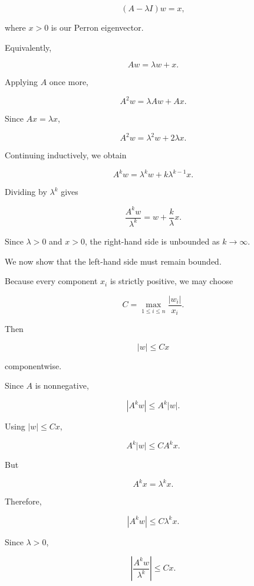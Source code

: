 \documentclass[11pt,a4paper]{article}
\theoremstyle{definition}
\theoremstyle{remark}
\begin{document}
\begin{equation}
(A-\lambda I)w=x,
\label{eq:perron_generalized_vector}
\end{equation}

where $x>0$ is our
Perron eigenvector.

Equivalently,

\[
Aw=\lambda w+x.
\]

Applying $A$ once more,

\[
A^2w
=
\lambda Aw+Ax.
\]

Since $Ax=\lambda x$,

\[
A^2w
=
\lambda^2w+2\lambda x.
\]

Continuing inductively,
we obtain

\begin{equation}
A^kw
=
\lambda^kw+k\lambda^{k-1}x.
\label{eq:perron_jordan_growth}
\end{equation}

Dividing by $\lambda^k$ gives

\begin{equation}
\frac{A^kw}{\lambda^k}
=
w+\frac{k}{\lambda}x.
\label{eq:perron_unbounded_growth}
\end{equation}

Since $\lambda>0$ and
$x>0$, the right-hand side
is unbounded as
$k\to\infty$.

We now show that the
left-hand side must
remain bounded.

Because every component
$x_i$ is strictly positive,
we may choose

\[
C=
\max_{1\leq i\leq n}
\frac{|w_i|}{x_i}.
\]

Then

\[
|w|\leq Cx
\]

componentwise.

Since $A$ is nonnegative,

\[
|A^kw|\leq A^k|w|.
\]

Using $|w|\leq Cx$,

\[
A^k|w|\leq CA^kx.
\]

But

\[
A^kx=\lambda^kx.
\]

Therefore,

\[
|A^kw|\leq C\lambda^kx.
\]

Since $\lambda>0$,

\begin{equation}
\boxed{
\left|
\frac{A^kw}{\lambda^k}
\right|
\leq Cx.
}
\label{eq:perron_bounded_growth}
\end{equation}
\end{document}
